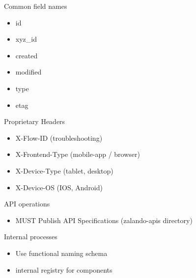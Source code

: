 \documentclass[10pt]{beamer}
\begin{document}
\begin{frame}{Common field names}

  \begin{itemize}

    \item
          id
    \item
          xyz\_id
    \item
          created
    \item
          modified
    \item
          type
    \item
          etag
  \end{itemize}

\end{frame}

\begin{frame}{Proprietary Headers}

  \begin{itemize}

    \item
          X-Flow-ID (troubleshooting)
    \item
          X-Frontend-Type (mobile-app / browser)
    \item
          X-Device-Type (tablet, desktop)
    \item
          X-Device-OS (IOS, Android)
  \end{itemize}

\end{frame}

\begin{frame}{API operations}

  \begin{itemize}

    \item
          MUST Publish API Specifications (zalando-apis directory)
  \end{itemize}

\end{frame}

\begin{frame}{Internal processes}

  \begin{itemize}

    \item
          Use functional naming schema
    \item
          internal registry for components
  \end{itemize}

\end{frame}
\end{document}
